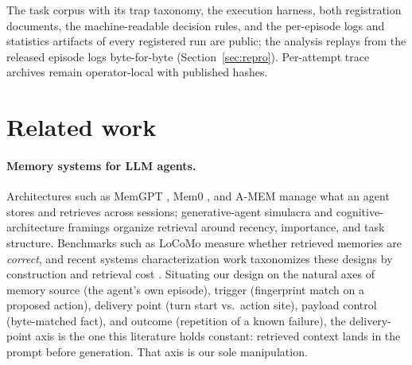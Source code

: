 \documentclass[11pt]{article}
\begin{document}
\begin{center}
\end{center}

The task corpus with its trap taxonomy, the execution harness, both
registration documents, the machine-readable decision rules, and the
per-episode logs and statistics artifacts of every registered run are public;
the analysis replays from the released episode logs byte-for-byte
(Section~\ref{sec:repro}). Per-attempt trace archives remain operator-local
with published hashes.

\section{Related work}
\label{sec:related}

\paragraph{Memory systems for LLM agents.}
Architectures such as MemGPT \citep{packer2023memgpt}, Mem0
\citep{chhikara2025mem0}, and A-MEM \citep{xu2025amem} manage what an agent
stores and retrieves across sessions; generative-agent simulacra
\citep{park2023generativeagents} and cognitive-architecture framings
\citep{sumers2023coala} organize retrieval around recency, importance, and
task structure. Benchmarks such as LoCoMo \citep{maharana2024locomo} measure
whether retrieved memories are \emph{correct}, and recent systems
characterization work taxonomizes these designs by construction and
retrieval cost \citep{omri2026agentmemory}. Situating our design on the
natural axes of memory source (the agent's own episode), trigger
(fingerprint match on a proposed action), delivery point (turn start vs.\
action site), payload control (byte-matched fact), and outcome (repetition
of a known failure), the delivery-point axis is the one this literature
holds constant: retrieved context lands in the prompt before generation. That axis
is our sole manipulation.
\end{document}
